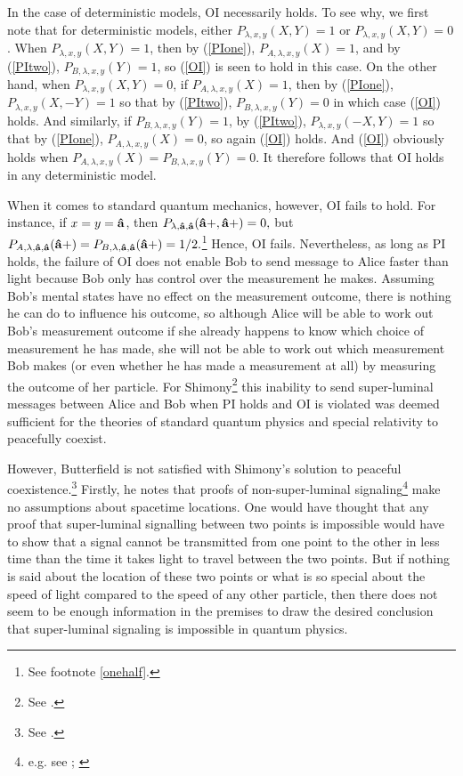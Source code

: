 In the case of deterministic models, OI necessarily holds. To see why, we first note that for deterministic models, either $P_{\lambda,x,y}(X,Y)=1$ or $P_{\lambda,x,y}(X,Y)=0$. When $P_{\lambda,x,y}(X,Y)=1$, then by (\ref{PIone}), $P_{A, \lambda,x,y}(X)=1$, and by (\ref{PItwo}), $P_{B, \lambda,x,y}(Y)=1$, so (\ref{OI}) is seen to hold in this case. On the other hand, when $P_{\lambda,x,y}(X,Y)=0$,  if $P_{A, \lambda,x,y}(X)=1$, then by (\ref{PIone}), $P_{\lambda,x,y} (X,-Y)=1$ so that by (\ref{PItwo}), $P_{B, \lambda,x,y}(Y)=0$ in which case (\ref{OI}) holds. And similarly, if $P_{B, \lambda,x,y}(Y)=1$, by (\ref{PItwo}), $P_{\lambda,x,y} (-X,Y)=1$ so that by (\ref{PIone}), $P_{A, \lambda,x,y}(X)=0$, so again (\ref{OI}) holds. And (\ref{OI}) obviously holds when $P_{A, \lambda,x,y}(X)=P_{B, \lambda,x,y}(Y)=0$. It therefore follows that OI holds in any deterministic model.

When it comes to standard quantum mechanics, however, OI fails to hold. For instance, if $x=y=\vb{\hat{a}}$, then $P_{\lambda,\vb{\hat{a}},\vb{\hat{a}}}(\vb{\hat{a}+},\vb{\hat{a}+})=0,$ but $P_{A, \lambda,\vb{\hat{a}},\vb{\hat{a}}}(\vb{\hat{a}+})=P_{B, \lambda,\vb{\hat{a}},\vb{\hat{a}}}(\vb{\hat{a}+})=1/2.$\footnote{See footnote \ref{onehalf}. } Hence, OI fails. Nevertheless, as long as PI holds, the failure of OI does not enable Bob to send message to Alice faster than light because Bob only has control over the measurement he makes. Assuming Bob's mental states have no effect on the measurement outcome, there is nothing he can do to influence his outcome, so although Alice will be able to work out Bob's measurement outcome if she already happens to know which choice of measurement he has made, she will not be able to work out which measurement Bob makes (or even whether he has made a measurement at all) by measuring the outcome of her particle. For Shimony\footnote{See \cite[146-147]{Shimony86}.} this inability to send super-luminal messages between Alice and Bob when PI holds and OI is violated was deemed sufficient for the theories of standard quantum physics and special relativity to peacefully coexist. 

However, Butterfield is not satisfied with Shimony's solution to peaceful coexistence.\footnote{See \cite[p. 12]{Butterfield}.} Firstly, he notes that proofs of non-super-luminal signaling\footnote{e.g. see \cite[p. 113--116]{Redhead}; \cite[p. 139--140]{Hiley}} make no assumptions about spacetime locations. One would have thought that any proof that super-luminal signalling between two points is impossible would have to show that a signal cannot be transmitted from one point to the other in less time than the time it takes light to travel between the two points. But if nothing is said about the location of these two points or what is so special about the speed of light compared to the speed of any other particle, then there does not seem to be enough information in the premises to draw the desired conclusion that super-luminal signaling is impossible in quantum physics.


